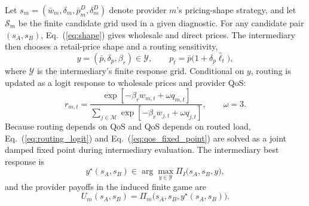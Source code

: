 \documentclass[11pt,a4paper]{article}
\newcommand{\M}{\mathcal{M}}
\begin{document}
Let $s_m=(\bar w_m,\delta_m,\bar p^D_m,\delta^D_m)$ denote provider $m$'s pricing-shape strategy, and let $\mathcal S_m$ be the finite candidate grid used in a given diagnostic. For any candidate pair $(s_A,s_B)$, Eq.~(\ref{eq:shape}) gives wholesale and direct prices. The intermediary then chooses a retail-price shape and a routing sensitivity,
\[
  y=(\bar p,\delta_p,\beta_r)\in\mathcal Y ,
  \qquad
  p_t=\bar p\big(1+\delta_p\widehat{\ell}_t\big),
\]
where $\mathcal Y$ is the intermediary's finite response grid. Conditional on $y$, routing is updated as a logit response to wholesale prices and provider QoS:
\begin{equation}
  r_{m,t}
  =
  \frac{\exp[-\beta_r w_{m,t}+\omega q_{m,t}]}
       {\sum_{j\in\M}\exp[-\beta_r w_{j,t}+\omega q_{j,t}]},
  \qquad \omega=3 .
  \label{eq:routing_logit}
\end{equation}
Because routing depends on QoS and QoS depends on routed load, Eq.~(\ref{eq:routing_logit}) and Eq.~(\ref{eq:qos_fixed_point}) are solved as a joint damped fixed point during intermediary evaluation. The intermediary best response is
\begin{equation}
  y^\star(s_A,s_B)\in
  \arg\max_{y\in\mathcal Y}
  \Pi_I\big(s_A,s_B,y\big),
  \label{eq:intermediary_best_response}
\end{equation}
and the provider payoffs in the induced finite game are
\begin{equation}
  U_m(s_A,s_B)=
  \Pi_m\big(s_A,s_B,y^\star(s_A,s_B)\big).
  \label{eq:finite_game_payoff}
\end{equation}
\end{document}
